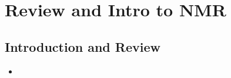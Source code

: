 \documentclass[../notes.tex]{subfiles}
\begin{document}
\chapter{Review and Intro to NMR}
\section{Introduction and Review}
\begin{itemize}
    \item {}
\end{itemize}
\end{document}

